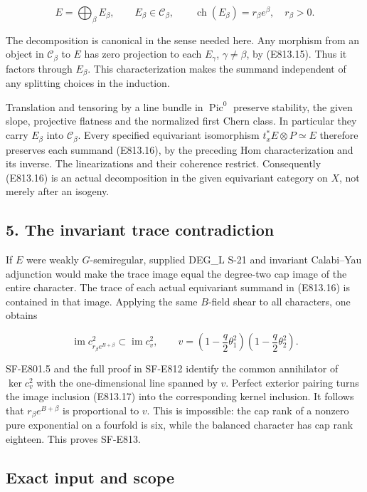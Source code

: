 \[
 E=\bigoplus_\beta E_\beta,
 \qquad E_\beta\in\mathcal C_\beta,
 \qquad \operatorname{ch}(E_\beta)=r_\beta e^\beta,
 \quad r_\beta>0.
 \tag{E813.16}
\]

The decomposition is canonical in the sense needed here. Any morphism
from an object in \(\mathcal C_\beta\) to \(E\) has zero projection to
each \(E_\gamma\), \(\gamma\ne\beta\), by (E813.15). Thus it factors
through \(E_\beta\). This characterization makes the summand independent
of any splitting choices in the induction.

Translation and tensoring by a line bundle in \(\operatorname{Pic}^0\)
preserve stability, the given slope, projective flatness and the
normalized first Chern class. In particular they carry \(E_\beta\) into
\(\mathcal C_\beta\). Every specified equivariant isomorphism
\(t_x^*E\otimes P\simeq E\) therefore preserves each summand (E813.16),
by the preceding Hom characterization and its inverse. The
linearizations and their coherence restrict. Consequently (E813.16) is
an actual decomposition in the given equivariant category on \(X\), not
merely after an isogeny.

\subsection{5. The invariant trace
contradiction}\label{SF-E813-the-invariant-trace-contradiction}

If \(E\) were weakly \(G\)-semiregular, supplied DEG\_L S-21 and
invariant Calabi--Yau adjunction would make the trace image equal the
degree-two cap image of the entire character. The trace of each actual
equivariant summand in (E813.16) is contained in that image. Applying
the same \(B\)-field shear to all characters, one obtains

\[
 \operatorname{im}c^2_{r_\beta e^{B+\beta}}
       \subset\operatorname{im}c^2_v,
 \qquad
 v=\left(1-\frac q2\theta_1^2\right)
   \left(1-\frac q2\theta_2^2\right).
 \tag{E813.17}
\]

SF-E801.5 and the full proof in SF-E812 identify the common annihilator
of \(\ker c^2_v\) with the one-dimensional line spanned by \(v\).
Perfect exterior pairing turns the image inclusion (E813.17) into the
corresponding kernel inclusion. It follows that \(r_\beta e^{B+\beta}\)
is proportional to \(v\). This is impossible: the cap rank of a nonzero
pure exponential on a fourfold is six, while the balanced character has
cap rank eighteen. This proves SF-E813.

\subsection{Exact input and scope}\label{SF-E813-exact-input-and-scope}

